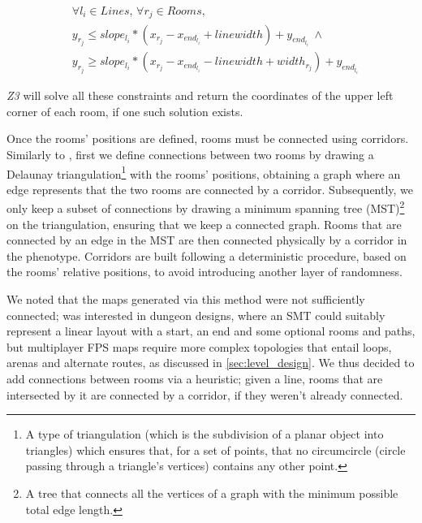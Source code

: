\begin{equation}
\label{eq:room_line}
    \begin{split}
        &\forall l_i \in Lines,\, \forall r_j \in Rooms, \\
        &y_{r_j} \leq slope_{l_i} * (x_{r_j} - x_{end_{l_i}} + linewidth) + y_{end_{l_i}} \:\land \\
        &y_{r_j} \geq slope_{l_i} * (x_{r_j} - x_{end_{l_i}} - linewidth + width_{r_j}) + y_{end_{l_i}}
    \end{split}
\end{equation}

\textit{Z3} will solve all these constraints and return the coordinates of the upper left corner of each room, if one such solution exists.

Once the rooms' positions are defined, rooms must be connected using corridors. Similarly to \citeauthor{whitehead_spatial_2020}, first we define connections between two rooms by drawing a Delaunay triangulation\footnote{A type of triangulation (which is the subdivision of a planar object into triangles) which ensures that, for a set of points, that no circumcircle (circle passing through a triangle's vertices) contains any other point.} with the rooms' positions, obtaining a graph where an edge represents that the two rooms are connected by a corridor. Subsequently, we only keep a subset of connections by drawing a minimum spanning tree (MST)\footnote{A tree that connects all the vertices of a graph with the minimum possible total edge length.} on the triangulation, ensuring that we keep a connected graph. Rooms that are connected by an edge in the MST are then connected physically by a corridor in the phenotype. Corridors are built following a deterministic procedure, based on the rooms' relative positions, to avoid introducing another layer of randomness. 

We noted that the maps generated via this method were not sufficiently connected; \citeauthor{whitehead_spatial_2020} was interested in dungeon designs, where an SMT could suitably represent a linear layout with a start, an end and some optional rooms and paths, but multiplayer FPS maps require more complex topologies that entail loops, arenas and alternate routes, as discussed in \cref{sec:level_design}. We thus decided to add connections between rooms via a heuristic; given a line, rooms that are intersected by it are connected by a corridor, if they weren't already connected.

